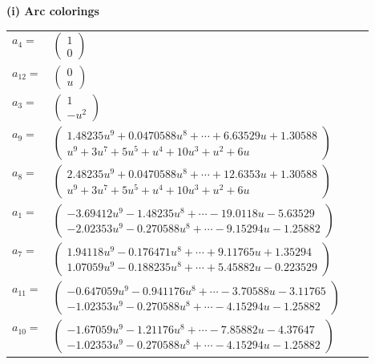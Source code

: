 \documentclass[1p]{elsarticle_modified}
\theoremstyle{definition}
\begin{document}
\flushleft \textbf{(i) Arc colorings}\\
\begin{tabular}{m{7pt} m{180pt} m{7pt} m{180pt} }
\flushright $a_{4}=$&$\begin{pmatrix}1\\0\end{pmatrix}$ \\
\flushright $a_{12}=$&$\begin{pmatrix}0\\u\end{pmatrix}$ \\
\flushright $a_{3}=$&$\begin{pmatrix}1\\- u^2\end{pmatrix}$ \\
\flushright $a_{9}=$&$\begin{pmatrix}1.48235 u^{9}+0.0470588 u^{8}+\cdots+6.63529 u+1.30588\\u^9+3 u^7+5 u^5+u^4+10 u^3+u^2+6 u\end{pmatrix}$ \\
\flushright $a_{8}=$&$\begin{pmatrix}2.48235 u^{9}+0.0470588 u^{8}+\cdots+12.6353 u+1.30588\\u^9+3 u^7+5 u^5+u^4+10 u^3+u^2+6 u\end{pmatrix}$ \\
\flushright $a_{1}=$&$\begin{pmatrix}-3.69412 u^{9}-1.48235 u^{8}+\cdots-19.0118 u-5.63529\\-2.02353 u^{9}-0.270588 u^{8}+\cdots-9.15294 u-1.25882\end{pmatrix}$ \\
\flushright $a_{7}=$&$\begin{pmatrix}1.94118 u^{9}-0.176471 u^{8}+\cdots+9.11765 u+1.35294\\1.07059 u^{9}-0.188235 u^{8}+\cdots+5.45882 u-0.223529\end{pmatrix}$ \\
\flushright $a_{11}=$&$\begin{pmatrix}-0.647059 u^{9}-0.941176 u^{8}+\cdots-3.70588 u-3.11765\\-1.02353 u^{9}-0.270588 u^{8}+\cdots-4.15294 u-1.25882\end{pmatrix}$ \\
\flushright $a_{10}=$&$\begin{pmatrix}-1.67059 u^{9}-1.21176 u^{8}+\cdots-7.85882 u-4.37647\\-1.02353 u^{9}-0.270588 u^{8}+\cdots-4.15294 u-1.25882\end{pmatrix}$ \\

\end{tabular}
\end{document}
